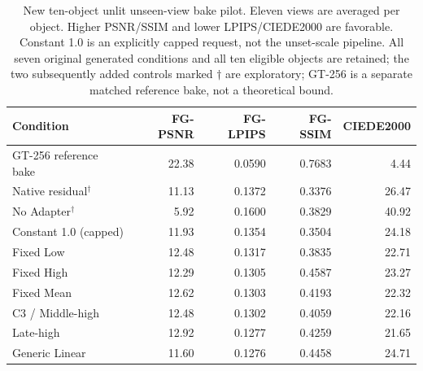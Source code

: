 \documentclass[times,twocolumn,final]{elsarticle}
\providecommand{\DIFaddbegin}{} %
\providecommand{\DIFaddend}{} %
\providecommand{\DIFdelend}{} %
\begin{document}
\DIFdelend \DIFaddbegin \begin{table}[ht]
\centering\scriptsize
\caption{New ten-object unlit unseen-view bake pilot. Eleven views are averaged per object. Higher PSNR/SSIM and lower LPIPS/CIEDE2000 are favorable. Constant 1.0 is an explicitly capped request, not the unset-scale pipeline. All seven original generated conditions and all ten eligible objects are retained; the two subsequently added controls marked $\dagger$ are exploratory; GT-256 is a separate matched reference bake, not a theoretical bound.}
\label{tab:new-bake}
\begin{tabular}{lrrrr}
\toprule Condition & FG-PSNR & FG-LPIPS & FG-SSIM & CIEDE2000 \\
\midrule
GT-256 reference bake & 22.38 & 0.0590 & 0.7683 & 4.44 \\
\midrule
Native residual$^\dagger$ & 11.13 & 0.1372 & 0.3376 & 26.47 \\
No Adapter$^\dagger$ & 5.92 & 0.1600 & 0.3829 & 40.92 \\
Constant 1.0 (capped) & 11.93 & 0.1354 & 0.3504 & 24.18 \\
Fixed Low & 12.48 & 0.1317 & 0.3835 & 22.71 \\
Fixed High & 12.29 & 0.1305 & 0.4587 & 23.27 \\
Fixed Mean & 12.62 & 0.1303 & 0.4193 & 22.32 \\
C3 / Middle-high & 12.48 & 0.1302 & 0.4059 & 22.16 \\
Late-high & 12.92 & 0.1277 & 0.4259 & 21.65 \\
Generic Linear & 11.60 & 0.1276 & 0.4458 & 24.71 \\
\bottomrule\end{tabular}
\end{table}
\DIFaddend 
\end{document}
